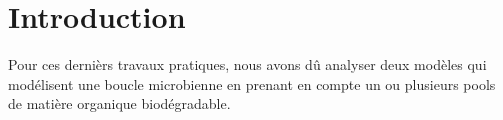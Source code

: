 \section{Introduction}

\par{
Pour ces dernièrs travaux pratiques, nous avons dû analyser deux modèles qui modélisent une boucle microbienne en
prenant en compte un ou plusieurs pools de matière organique biodégradable.
}
